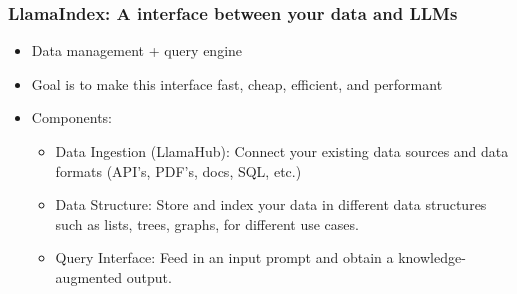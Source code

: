 \begin{frame}[fragile]\frametitle{LlamaIndex: A interface between your data and LLMs }


\begin{itemize}
\item Data management + query engine
\item Goal is to make this interface fast, cheap, efficient, and performant 
\item Components:
	\begin{itemize}
	\item Data Ingestion (LlamaHub): Connect your existing data sources and data formats (API’s, PDF’s, docs, SQL, etc.)
	\item Data Structure: Store and index your data in different data structures such as lists, trees, graphs, for different use cases. 
	\item Query Interface: Feed in an input prompt and obtain a knowledge-augmented output.
	\end{itemize}	

\end{itemize}	



\end{frame}
